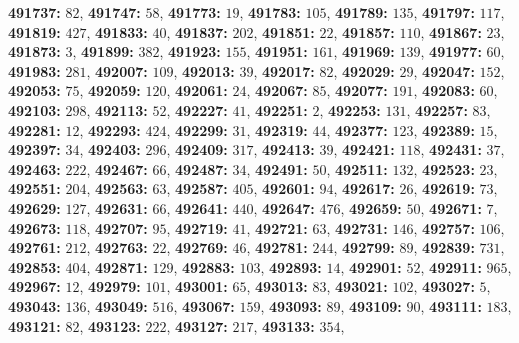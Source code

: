 \textsf{\bfseries 491737:} $82$, \textsf{\bfseries 491747:} $58$, \textsf{\bfseries 491773:} $19$, \textsf{\bfseries 491783:} $105$, \textsf{\bfseries 491789:} $135$, \textsf{\bfseries 491797:} $117$, \textsf{\bfseries 491819:} $427$, \textsf{\bfseries 491833:} $40$, \textsf{\bfseries 491837:} $202$, \textsf{\bfseries 491851:} $22$, \textsf{\bfseries 491857:} $110$, \textsf{\bfseries 491867:} $23$, \textsf{\bfseries 491873:} $3$, \textsf{\bfseries 491899:} $382$, \textsf{\bfseries 491923:} $155$, \textsf{\bfseries 491951:} $161$, \textsf{\bfseries 491969:} $139$, \textsf{\bfseries 491977:} $60$, \textsf{\bfseries 491983:} $281$, \textsf{\bfseries 492007:} $109$, \textsf{\bfseries 492013:} $39$, \textsf{\bfseries 492017:} $82$, \textsf{\bfseries 492029:} $29$, \textsf{\bfseries 492047:} $152$, \textsf{\bfseries 492053:} $75$, \textsf{\bfseries 492059:} $120$, \textsf{\bfseries 492061:} $24$, \textsf{\bfseries 492067:} $85$, \textsf{\bfseries 492077:} $191$, \textsf{\bfseries 492083:} $60$, \textsf{\bfseries 492103:} $298$, \textsf{\bfseries 492113:} $52$, \textsf{\bfseries 492227:} $41$, \textsf{\bfseries 492251:} $2$, \textsf{\bfseries 492253:} $131$, \textsf{\bfseries 492257:} $83$, \textsf{\bfseries 492281:} $12$, \textsf{\bfseries 492293:} $424$, \textsf{\bfseries 492299:} $31$, \textsf{\bfseries 492319:} $44$, \textsf{\bfseries 492377:} $123$, \textsf{\bfseries 492389:} $15$, \textsf{\bfseries 492397:} $34$, \textsf{\bfseries 492403:} $296$, \textsf{\bfseries 492409:} $317$, \textsf{\bfseries 492413:} $39$, \textsf{\bfseries 492421:} $118$, \textsf{\bfseries 492431:} $37$, \textsf{\bfseries 492463:} $222$, \textsf{\bfseries 492467:} $66$, \textsf{\bfseries 492487:} $34$, \textsf{\bfseries 492491:} $50$, \textsf{\bfseries 492511:} $132$, \textsf{\bfseries 492523:} $23$, \textsf{\bfseries 492551:} $204$, \textsf{\bfseries 492563:} $63$, \textsf{\bfseries 492587:} $405$, \textsf{\bfseries 492601:} $94$, \textsf{\bfseries 492617:} $26$, \textsf{\bfseries 492619:} $73$, \textsf{\bfseries 492629:} $127$, \textsf{\bfseries 492631:} $66$, \textsf{\bfseries 492641:} $440$, \textsf{\bfseries 492647:} $476$, \textsf{\bfseries 492659:} $50$, \textsf{\bfseries 492671:} $7$, \textsf{\bfseries 492673:} $118$, \textsf{\bfseries 492707:} $95$, \textsf{\bfseries 492719:} $41$, \textsf{\bfseries 492721:} $63$, \textsf{\bfseries 492731:} $146$, \textsf{\bfseries 492757:} $106$, \textsf{\bfseries 492761:} $212$, \textsf{\bfseries 492763:} $22$, \textsf{\bfseries 492769:} $46$, \textsf{\bfseries 492781:} $244$, \textsf{\bfseries 492799:} $89$, \textsf{\bfseries 492839:} $731$, \textsf{\bfseries 492853:} $404$, \textsf{\bfseries 492871:} $129$, \textsf{\bfseries 492883:} $103$, \textsf{\bfseries 492893:} $14$, \textsf{\bfseries 492901:} $52$, \textsf{\bfseries 492911:} $965$, \textsf{\bfseries 492967:} $12$, \textsf{\bfseries 492979:} $101$, \textsf{\bfseries 493001:} $65$, \textsf{\bfseries 493013:} $83$, \textsf{\bfseries 493021:} $102$, \textsf{\bfseries 493027:} $5$, \textsf{\bfseries 493043:} $136$, \textsf{\bfseries 493049:} $516$, \textsf{\bfseries 493067:} $159$, \textsf{\bfseries 493093:} $89$, \textsf{\bfseries 493109:} $90$, \textsf{\bfseries 493111:} $183$, \textsf{\bfseries 493121:} $82$, \textsf{\bfseries 493123:} $222$, \textsf{\bfseries 493127:} $217$, \textsf{\bfseries 493133:} $354$, 

